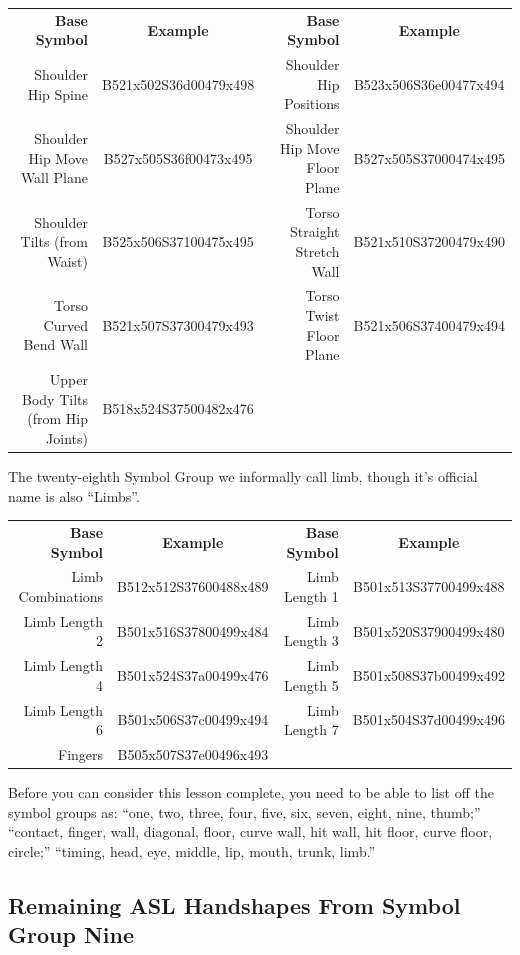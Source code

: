 \documentclass{article}
\begin{document}
\begin{center}
\begin{tabular}{rcrc}
\textbf{Base Symbol}&\textbf{Example}&\textbf{Base Symbol}&\textbf{Example}\\
Shoulder Hip Spine                &B521x502S36d00479x498&Shoulder Hip Positions       &B523x506S36e00477x494\\
Shoulder Hip Move Wall Plane      &B527x505S36f00473x495&Shoulder Hip Move Floor Plane&B527x505S37000474x495\\
Shoulder Tilts (from Waist)       &B525x506S37100475x495&Torso Straight Stretch Wall  &B521x510S37200479x490\\
Torso Curved Bend Wall            &B521x507S37300479x493&Torso Twist Floor Plane      &B521x506S37400479x494\\
Upper Body Tilts (from Hip Joints)&B518x524S37500482x476\\
\end{tabular}
\end{center}

The twenty-eighth Symbol Group we informally call limb, though it's official name is also ``Limbs''.

\begin{center}
\begin{tabular}{rcrc}
\textbf{Base Symbol}&\textbf{Example}&\textbf{Base Symbol}&\textbf{Example}\\
Limb Combinations&B512x512S37600488x489&Limb Length 1&B501x513S37700499x488\\
Limb Length 2    &B501x516S37800499x484&Limb Length 3&B501x520S37900499x480\\
Limb Length 4    &B501x524S37a00499x476&Limb Length 5&B501x508S37b00499x492\\
Limb Length 6    &B501x506S37c00499x494&Limb Length 7&B501x504S37d00499x496\\
Fingers          &B505x507S37e00496x493\\
\end{tabular}
\end{center}

Before you can consider this lesson complete, you need to be able to list off the symbol groups as:
``one, two, three, four, five, six, seven, eight, nine, thumb;''
``contact, finger, wall, diagonal, floor, curve wall, hit wall, hit floor, curve floor, circle;''
``timing, head, eye, middle, lip, mouth, trunk, limb.''

\subsection{Remaining ASL Handshapes From Symbol Group Nine}
\end{document}
